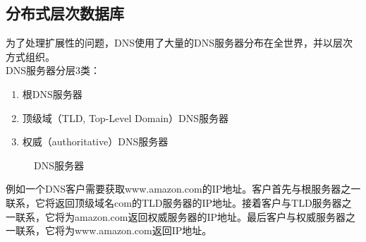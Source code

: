 \vspace{0.5cm}

\subsection{分布式层次数据库}

为了处理扩展性的问题，DNS使用了大量的DNS服务器分布在全世界，并以层次方式组织。\\

DNS服务器分层3类：

\begin{enumerate}
    \item 根DNS服务器
    \item 顶级域（TLD, Top-Level Domain）DNS服务器
    \item 权威（authoritative）DNS服务器
\end{enumerate}

\begin{figure}[H]
    \centering
    \caption{DNS服务器}
\end{figure}

\vspace{0.5cm}

例如一个DNS客户需要获取www.amazon.com的IP地址。客户首先与根服务器之一联系，它将返回顶级域名com的TLD服务器的IP地址。接着客户与TLD服务器之一联系，它将为amazon.com返回权威服务器的IP地址。最后客户与权威服务器之一联系，它将为www.amazon.com返回IP地址。\\

